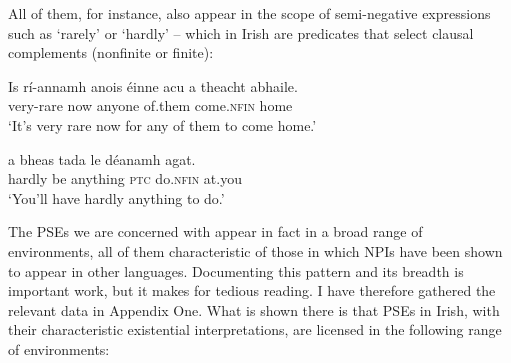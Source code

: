 \documentclass[output=paper,colorlinks,citecolor=brown]{langscibook}
\begin{document}
All of them, for instance, also appear in the scope of semi-negative expressions such as `rarely' or `hardly' -- which in Irish are predicates that select clausal complements (nonfinite or finite):

\ea
\gll Is rí-annamh anois éinne acu {a theacht} abhaile. \\
     {\cop} {very-rare} now anyone {of.them} {come.\textsc{nfin}} home \\
\glt `It's very rare now for any of them to come home.'
\z


\ea
{} a bheas tada le déanamh agat.\\
     hardly  {\C} {be\fut} anything {\scshape ptc} {do.\textsc{nfin}} at.you \\
\glt `You'll have hardly anything to do.'
\z


The PSEs we are concerned with appear in fact in a broad range of environments, all of them characteristic of those in which NPIs have been shown to appear in other languages. Documenting this pattern and its breadth is important work, but it makes for tedious reading. I have therefore gathered the relevant data in Appendix One. What is shown there is that PSEs in Irish, with their characteristic existential interpretations, are licensed in the following range of environments:

\end{document}
